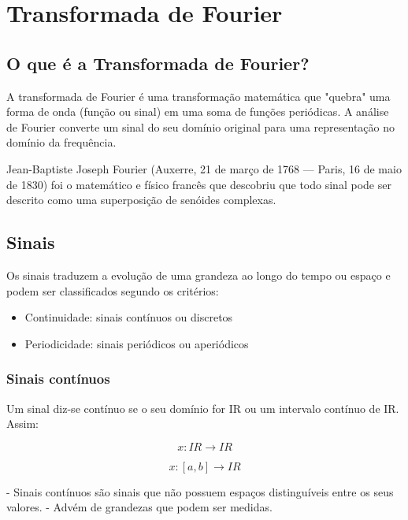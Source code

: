 \section{Transformada de Fourier}

\subsection{O que é a Transformada de Fourier?}

A transformada de Fourier é uma transformação matemática que "quebra" uma forma de onda (função ou sinal) em uma soma de funções periódicas. A análise de Fourier converte um sinal do seu domínio original para uma representação no domínio da frequência.

Jean-Baptiste Joseph Fourier (Auxerre, 21 de março de 1768 — Paris, 16 de maio de 1830) foi o matemático e físico francês que descobriu que todo sinal pode ser descrito como uma superposição de senóides complexas.

\subsection{Sinais}
Os sinais traduzem a evolução de uma grandeza ao longo do tempo ou espaço e podem ser classificados segundo os critérios:

\begin{itemize}
\item Continuidade: sinais contínuos ou discretos
\item Periodicidade: sinais periódicos ou aperiódicos 
\end{itemize}

\subsubsection{Sinais contínuos}

Um sinal diz-se contínuo se o seu domínio for IR ou um intervalo contínuo de IR. Assim:

\begin{equation}
x: IR \rightarrow IR 
\tag{3.1}
\end{equation}
	
\begin{equation}
x: [a,b] \rightarrow IR
\tag{3.2} 
\end{equation}

- Sinais contínuos são sinais que não possuem espaços distinguíveis entre os seus valores.
- Advém de grandezas que podem ser medidas.

